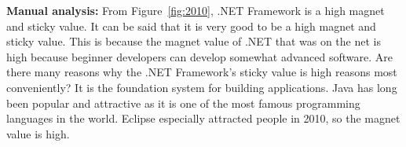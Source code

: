 \documentclass[english,preprint,JIP]{ipsj}
\begin{document}

\medskip



\textbf{Manual analysis:}
From Figure~\ref{fig:2010}, .NET Framework is a high magnet and sticky value. It can be said that it is very good to be a high magnet and sticky value. This is because the magnet value of .NET that was on the net is high because beginner developers can develop somewhat advanced software. Are there many reasons why the .NET Framework's sticky value is high reasons most conveniently? It is the foundation system for building applications. Java has long been popular and attractive as it is one of the most famous programming languages ​​in the world. Eclipse especially attracted people in 2010, so the magnet value is high.
\medskip
\end{document}
